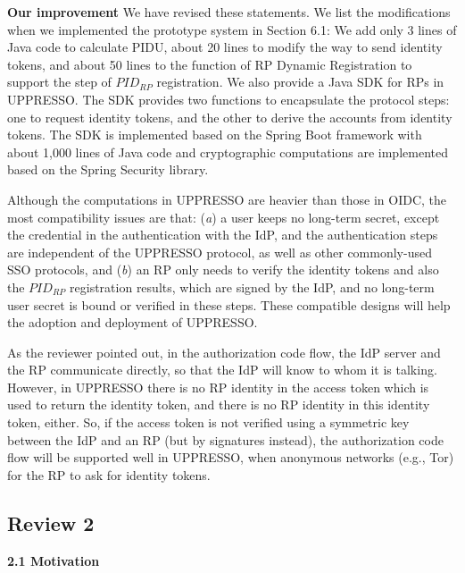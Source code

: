 \documentclass[letterpaper,onecolumn,10pt]{article}
\begin{document}

\vspace{1mm}\noindent\textbf{Our improvement}
We have revised these statements. We list the modifications when we implemented the prototype system in Section 6.1:
We add only 3 lines of Java code to calculate PIDU, about 20 lines to modify the way to send identity tokens,
 and about 50 lines to the function of RP Dynamic Registration to support the step of $PID_{RP}$ registration.
We also provide a Java SDK for RPs in UPPRESSO. 
The SDK provides two functions to encapsulate the protocol steps:
one to request identity tokens, and the other to derive the accounts from identity tokens.
 The SDK is implemented based on the Spring Boot framework with about 1,000 lines of Java code
  and cryptographic computations are implemented based on the Spring Security library.

Although the computations in UPPRESSO are heavier than those in OIDC,
    the most compatibility issues are that: (\emph{a}) a user keeps no long-term secret, except the credential in the authentication with the IdP,
        and the authentication steps are independent of the UPPRESSO protocol, as well as other commonly-used SSO protocols,
        and (\emph{b}) an RP only needs to verify the identity tokens and also the $PID_{RP}$ registration results, which are signed by the IdP,
                and no long-term user secret is bound or verified in these steps.
These compatible designs will help the adoption and deployment of UPPRESSO.

As the reviewer pointed out, 
    in the authorization code flow, the IdP server and the RP communicate directly, so that the IdP will know to whom it is talking.
However,
        in UPPRESSO there is no RP identity in the access token which is used to return the identity token,
            and there is no RP identity in this identity token, either.
So, if the access token is not verified using a symmetric key between the IdP and an RP (but by signatures instead),
    the authorization code flow will be supported well in UPPRESSO,
        when anonymous networks (e.g., Tor) for the RP to ask for identity tokens.

\subsection*{Review 2}
\noindent\textbf{2.1 Motivation}
\end{document}

